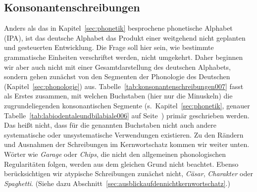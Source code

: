 \subsection{Konsonantenschreibungen}
\label{sec:konsonantenschreibungen}

Anders als das in Kapitel~\ref{sec:phonetik} besprochene phonetische Alphabet (IPA), ist das deutsche Alphabet das Produkt einer weitgehend nicht geplanten und gesteuerten Entwicklung.
Die Frage soll hier sein, wie bestimmte grammatische Einheiten verschriftet werden, nicht umgekehrt.
Daher beginnen wir aber auch nicht mit einer Gesamtdarstellung des deutschen Alphabets, sondern gehen zunächst von den Segmenten der Phonologie des Deutschen (Kapitel~\ref{sec:phonologie}) aus.
Tabelle~\ref{tab:konsonantenschreibungen007} fasst als Erstes zusammen, mit welchen Buchstaben (hier nur die Minuskeln) die zugrundeliegenden konsonantischen Segmente (s.\ Kapitel~\ref{sec:phonetik}, genauer Tabelle~\ref{tab:labiodentaleundbilabiale006} auf Seite~\pageref{tab:labiodentaleundbilabiale006}) primär geschrieben werden.
Das heißt nicht, dass für die genannten Buchstaben nicht auch andere systematische oder unsystematische Verwendungen existieren.
Zu den Rändern und Ausnahmen der Schreibungen im Kernwortschatz kommen wir weiter unten.
Wörter wie \textit{Garage} oder \textit{Chips}, die nicht den allgemeinen phonologischen Regularitäten folgen, werden aus dem gleichen Grund nicht beachtet.
Ebenso berücksichtigen wir atypische Schreibungen zunächst nicht, \zB \textit{Cäsar}, \textit{Charakter} oder \textit{Spaghetti}.
(Siehe dazu Abschnitt~\ref{sec:ausblickaufdennichtkernwortschatz}.)


